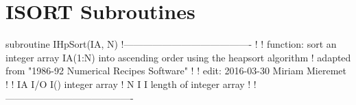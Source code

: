 \section{ISORT Subroutines}

subroutine IHpSort(IA, N)
!----------------------------------------
!
!  function: sort an integer array IA(1:N) into ascending order using the heapsort algorithm
!            adapted from "1986-92 Numerical Recipes Software"
!
!  edit: 2016-03-30 Miriam Mieremet 
!
!  IA   I/O   I()   integer array
!  N    I     I     length of integer array
!
!----------------------------------------